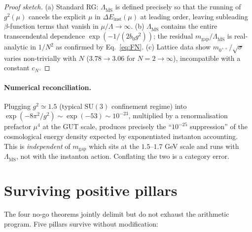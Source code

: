 \documentclass[aps,prl,reprint,superscriptaddress,floatfix,nofootinbib,amssymb]{revtex4-2}
\theoremstyle{definition}
\theoremstyle{remark}
\newcommand{\msb}{\overline{\mathrm{MS}}}
\begin{document}
\begin{proof}[Proof sketch]
(a) Standard RG: $\Lambda_{\msb}$ is defined precisely so that the
running of $g^2(\mu)$ cancels the explicit $\mu$ in $\Delta
E_{\mathrm{inst}}(\mu)$ at leading order, leaving subleading
$\beta$-function terms that vanish in $\mu/\Lambda \to \infty$.
(b) $\Lambda_{\msb}$ contains the entire transcendental dependence
$\exp(-1/(2 b_0 g^2))$; the residual $m_{\text{gap}}/\Lambda_{\msb}$
is real-analytic in $1/N^2$ as confirmed by Eq.~\eqref{eq:FN}.
(c) Lattice data \cite[Tab.~34]{AthenodorouTeper2021} show
$m_{0^{++}}/\sqrt{\sigma}$ varies non-trivially with $N$
($3.78\to 3.06$ for $N=2 \to \infty$), incompatible with a constant
$c_N$.
\end{proof}

\paragraph{Numerical reconciliation.}
Plugging $g^2 \simeq 1.5$ (typical $\mathrm{SU}(3)$ confinement
regime) into $\exp(-8\pi^2/g^2) \sim \exp(-53) \sim 10^{-23}$,
multiplied by a renormalisation prefactor $\mu^4$ at the GUT scale,
produces precisely the ``$10^{-25}$ suppression'' of the cosmological
energy density expected by exponentiated instanton accounting. This
is \emph{independent} of $m_{\text{gap}}$ which sits at the
$1.5$--$1.7$ GeV scale and runs with $\Lambda_{\msb}$, not with the
instanton action. Conflating the two is a category error.

\section{Surviving positive pillars}\label{sec:pillars}

The four no-go theorems jointly delimit but do not exhaust the
arithmetic program. Five pillars survive without modification:
\end{document}
